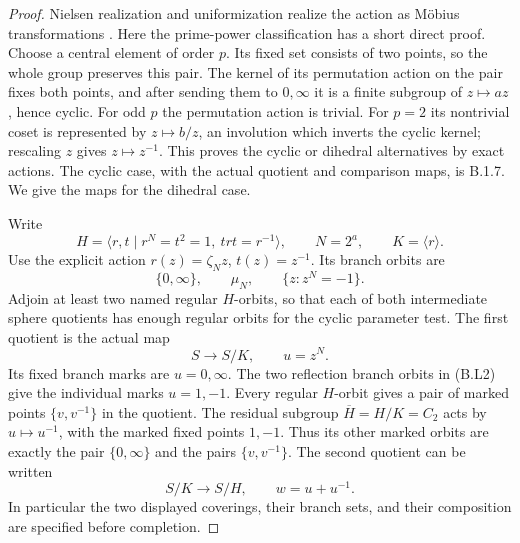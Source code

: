 \begin{proof}
Nielsen realization and uniformization realize the action as
M\"obius transformations \cite[Theorem 5 and \S IV]{CA_Kerckhoff1983}.
Here the prime-power classification has a short direct proof.
Choose a central element of order $p$.  Its fixed set consists
of two points, so the whole group preserves this pair.  The
kernel of its permutation action on the pair fixes both points,
and after sending them to $0,\infty$ it is a finite subgroup of
$z\mapsto az$, hence cyclic.  For odd $p$ the permutation action
is trivial.  For $p=2$ its nontrivial coset is represented by
$z\mapsto b/z$, an involution which inverts the cyclic kernel;
rescaling $z$ gives $z\mapsto z^{-1}$.  This proves the cyclic
or dihedral alternatives by exact actions.  The cyclic case,
with the actual quotient and comparison maps, is B.1.7.  We
give the maps for the dihedral case.

Write
\[
 H=\langle r,t\mid r^N=t^2=1,\ trt=r^{-1}\rangle,
 \qquad N=2^a,
 \qquad K=\langle r\rangle.
                                                               \tag{B.L1}
\]
Use the explicit action $r(z)=\zeta_N z$, $t(z)=z^{-1}$.
Its branch orbits are
\[
 \{0,\infty\},\qquad \mu_N,\qquad
              \{z:z^N=-1\}.                              \tag{B.L2}
\]
Adjoin at least two named regular $H$-orbits, so that each of
both intermediate sphere quotients has enough regular orbits
for the cyclic parameter test.  The first quotient is the
actual map
\[
 S\longrightarrow S/K,\qquad u=z^N.                       \tag{B.L3}
\]
Its fixed branch marks are $u=0,\infty$.  The two reflection
branch orbits in (B.L2) give the individual marks $u=1,-1$.
Every regular $H$-orbit gives a pair of marked points
$\{v,v^{-1}\}$ in the quotient.  The residual subgroup
$\overline H=H/K=C_2$ acts by $u\mapsto u^{-1}$, with the
marked fixed points $1,-1$.  Thus its other marked orbits
are exactly the pair $\{0,\infty\}$ and the pairs
$\{v,v^{-1}\}$.  The second quotient can be written
\[
 S/K\longrightarrow S/H,\qquad w=u+u^{-1}.                \tag{B.L4}
\]
In particular the two displayed coverings, their branch sets,
and their composition are specified before completion.


\end{proof}
